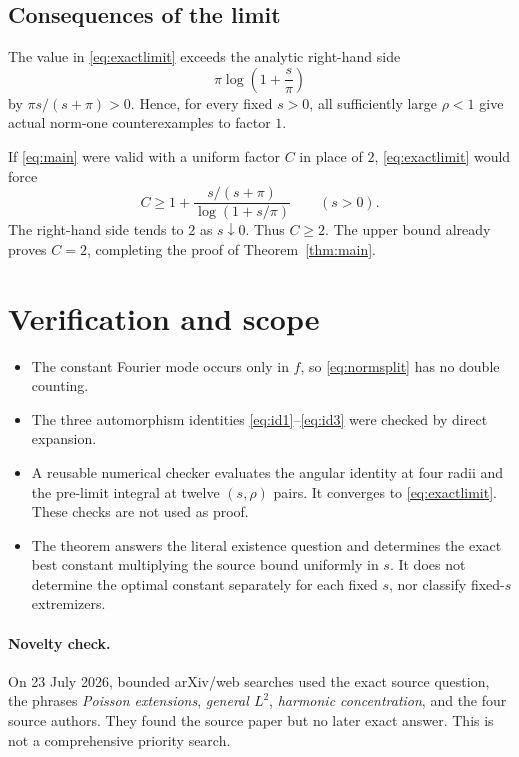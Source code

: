 \documentclass[11pt]{article}
\begin{document}
\subsection{Consequences of the limit}

The value in \eqref{eq:exactlimit} exceeds the analytic right-hand side
\[
 \pi\log\!\left(1+\frac{s}{\pi}\right)
\]
by \(\pi s/(s+\pi)>0\). Hence, for every fixed \(s>0\), all sufficiently
large \(\rho<1\) give actual norm-one counterexamples to factor \(1\).

If \eqref{eq:main} were valid with a uniform factor \(C\) in place of \(2\),
\eqref{eq:exactlimit} would force
\[
 C\ge
 1+\frac{s/(s+\pi)}{\log(1+s/\pi)}
 \qquad(s>0).
\]
The right-hand side tends to \(2\) as \(s\downarrow0\). Thus \(C\ge2\).
The upper bound already proves \(C=2\), completing the proof of
Theorem~\ref{thm:main}.

\section{Verification and scope}

\begin{itemize}[leftmargin=1.5em]
\item The constant Fourier mode occurs only in \(f\), so
  \eqref{eq:normsplit} has no double counting.
\item The three automorphism identities
  \eqref{eq:id1}--\eqref{eq:id3} were checked by direct expansion.
\item A reusable numerical checker evaluates the angular identity at four
  radii and the pre-limit integral at twelve \((s,\rho)\) pairs. It converges
  to \eqref{eq:exactlimit}. These checks are not used as proof.
\item The theorem answers the literal existence question and determines the
  exact best constant multiplying the source bound uniformly in \(s\).
  It does not determine the optimal constant separately for each fixed \(s\),
  nor classify fixed-\(s\) extremizers.
\end{itemize}

\paragraph{Novelty check.}
On 23 July 2026, bounded arXiv/web searches used the exact source question,
the phrases \emph{Poisson extensions}, \emph{general \(L^2\)},
\emph{harmonic concentration}, and the four source authors. They found the
source paper but no later exact answer. This is not a comprehensive priority
search.
\end{document}
